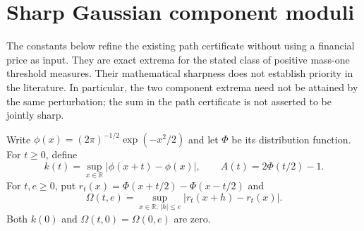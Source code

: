 \section{Sharp Gaussian component moduli}
\label{sec:sharp-common-information}

The constants below refine the existing path certificate without using a
financial price as input. They are exact extrema for the stated class of
positive mass-one threshold measures. Their mathematical sharpness does
not establish priority in the literature. In particular, the two
component extrema need not be attained by the same perturbation; the
sum in the path certificate is not asserted to be jointly sharp.

Write $\phi(x)=(2\pi)^{-1/2}\exp(-x^2/2)$ and let $\Phi$ be its
distribution function. For $t\geq0$, define
\begin{equation}
 k(t)=\sup_{x\in\mathbb R}|\phi(x+t)-\phi(x)|,
 \qquad A(t)=2\Phi(t/2)-1.
 \label{eq:sharp-k-A}
\end{equation}
For $t,e\geq0$, put $r_t(x)=\Phi(x+t/2)-\Phi(x-t/2)$ and
\begin{equation}
 \Omega(t,e)=\sup_{x\in\mathbb R,\,|h|\leq e}
                    |r_t(x+h)-r_t(x)|.
 \label{eq:sharp-Omega-definition}
\end{equation}
Both $k(0)$ and $\Omega(t,0)=\Omega(0,e)$ are zero.

